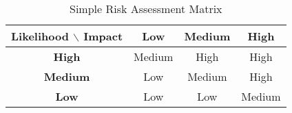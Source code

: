 \begin{table}
  \centering
  \begin{tabular}{|c|c|c|c|}
    \hline
    \textbf{Likelihood} $\backslash$ \textbf{Impact} & \textbf{Low} & \textbf{Medium} & \textbf{High} \\
    \hline
    \textbf{High}  & Medium & High   & High \\
    \textbf{Medium} & Low    & Medium & High \\
    \textbf{Low}    & Low    & Low    & Medium \\
    \hline
  \end{tabular}
    \caption{Simple Risk Assessment Matrix}
  \label{tab:risk-matrix}
\end{table}
